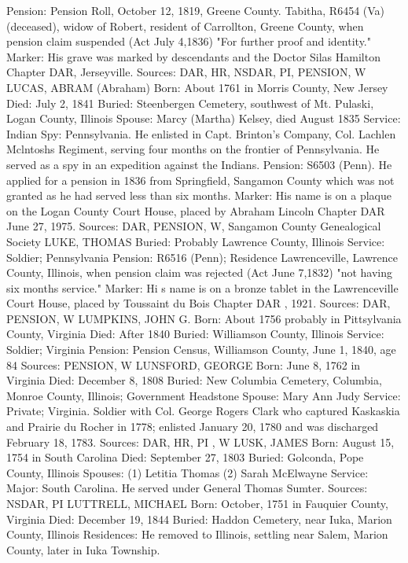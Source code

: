 Pension: Pension Roll, October 12, 1819, Greene County. Tabitha, R6454 (Va) (deceased), widow of Robert, resident of Carrollton, Greene County, when pension claim suspended (Act July 4,1836) "For further proof and identity." 
Marker: His grave was marked by descendants and the Doctor Silas Hamilton Chapter DAR, Jerseyville. 
Sources: DAR, HR, NSDAR, PI, PENSION, W 
LUCAS, ABRAM (Abraham)
Born: About 1761 in Morris County, New Jersey
Died: July 2, 1841
Buried: Steenbergen Cemetery, southwest of Mt. Pulaski, Logan County, Illinois
Spouse: Marcy (Martha) Kelsey, died August 1835
Service: Indian Spy: Pennsylvania. He enlisted in Capt. Brinton's Company, Col. Lachlen Mclntoshs Regiment, serving four months on the frontier of Pennsylvania. He served as a spy in an expedition against the Indians. 
Pension: S6503 (Penn). He applied for a pension in 1836 from Springfield, Sanga­mon County which was not granted as he had served less than six months.
Marker: His name is on a plaque on the Logan County Court House, placed by Abraham Lincoln Chapter DAR June 27, 1975. 
Sources: DAR, PENSION, W, Sangamon County Genealogical Society 
LUKE, THOMAS
Buried: Probably Lawrence County, Illinois
Service: Soldier; Pennsylvania 
Pension: R6516 (Penn); Residence Lawrenceville, Lawrence County, Illinois, when pension claim was rejected (Act June 7,1832) "not having six months service."
Marker: Hi s name is on a bronze tablet in the Lawrenceville Court House, placed by Toussaint du Bois Chapter DAR , 1921.
Sources: DAR, PENSION, W 
LUMPKINS, JOHN G.
Born: About 1756 probably in Pittsylvania County, Virginia
Died: After 1840
Buried: Williamson County, Illinois
Service: Soldier; Virginia
Pension: Pension Census, Williamson County, June 1, 1840, age 84
Sources: PENSION, W 
LUNSFORD, GEORGE
Born: June 8, 1762 in Virginia
Died: December 8, 1808 
Buried: New Columbia Cemetery, Columbia, Monroe County, Illinois; Government Headstone
Spouse: Mary Ann Judy 
Service: Private; Virginia. Soldier with Col. George Rogers Clark who captured Kaskaskia and Prairie du Rocher in 1778; enlisted January 20, 1780 and was discharged February 18, 1783. 
Sources: DAR, HR, PI , W 
LUSK, JAMES 
Born: August 15, 1754 in South Carolina
Died: September 27, 1803
Buried: Golconda, Pope County, Illinois 
Spouses: (1) Letitia Thomas 
	 (2) Sarah McElwayne
Service: Major: South Carolina. He served under General Thomas Sumter.
Sources: NSDAR, PI 
LUTTRELL, MICHAEL 
Born: October, 1751 in Fauquier County, Virginia 
Died: December 19, 1844 
Buried: Haddon Cemetery, near Iuka, Marion County, Illinois Residences: He removed to Illinois, settling near Salem, Marion County, later in Iuka Township.
